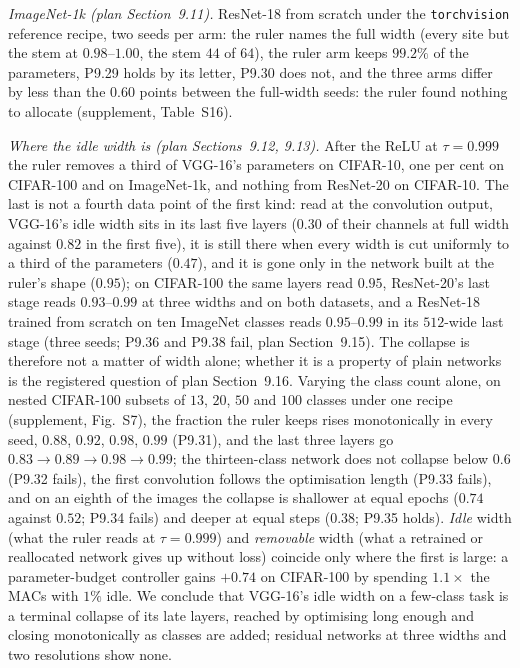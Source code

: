 \documentclass[10pt,journal,compsoc]{IEEEtran}
\begin{document}
\emph{ImageNet-1k (plan Section~9.11).} ResNet-18 from scratch under the
\texttt{torchvision} reference recipe, two seeds per arm: the ruler names
the full width (every site but the stem at $0.98$--$1.00$, the stem $44$ of
$64$), the ruler arm keeps $99.2\%$ of the parameters, P9.29 holds by
its letter, P9.30 does not, and the three arms differ by less than the
$0.60$ points between the full-width seeds: the ruler found nothing to
allocate (supplement, Table~S16).

\emph{Where the idle width is (plan Sections~9.12, 9.13).} After the ReLU
at $\tau = 0.999$ the ruler removes a third of VGG-16's parameters on
CIFAR-10, one per cent on CIFAR-100 and on ImageNet-1k, and nothing from
ResNet-20 on CIFAR-10. The last is not a fourth data point of the first
kind: read at the convolution output, VGG-16's idle width sits in its last
five layers ($0.30$ of their channels at full width against $0.82$ in the
first five), it is still there when every width is cut uniformly to a
third of the parameters ($0.47$), and it is gone only in the network built
at the ruler's shape ($0.95$); on CIFAR-100 the same layers read $0.95$,
ResNet-20's last stage reads $0.93$--$0.99$ at three widths and on both
datasets, and a ResNet-18 trained from scratch on ten ImageNet classes
reads $0.95$--$0.99$ in its $512$-wide last stage (three seeds; P9.36 and
P9.38 fail, plan Section~9.15). The collapse is therefore not a matter of
width alone; whether it is a property of plain networks is the registered
question of plan Section~9.16. Varying the
class count alone, on nested CIFAR-100 subsets of $13$, $20$, $50$ and $100$
classes under one recipe (supplement, Fig.~S7), the fraction the ruler
keeps rises monotonically in every seed, $0.88$, $0.92$, $0.98$, $0.99$
(P9.31), and the last three layers go $0.83 \to 0.89 \to 0.98 \to 0.99$;
the thirteen-class network does not collapse below $0.6$ (P9.32 fails),
the first convolution follows the optimisation length (P9.33 fails), and
on an eighth of the images the collapse is shallower at equal epochs
($0.74$ against $0.52$; P9.34 fails) and deeper at equal steps ($0.38$;
P9.35 holds). \emph{Idle} width (what the ruler reads at $\tau = 0.999$) and
\emph{removable} width (what a retrained or reallocated network gives up
without loss) coincide only where the first is large: a parameter-budget
controller gains $+0.74$ on CIFAR-100 by spending $1.1\times$ the MACs
with $1\%$ idle. We conclude that VGG-16's idle width on a few-class task is a
terminal collapse of its late layers, reached by optimising long enough
and closing monotonically as classes are added; residual networks at
three widths and two resolutions show none.
\end{document}
